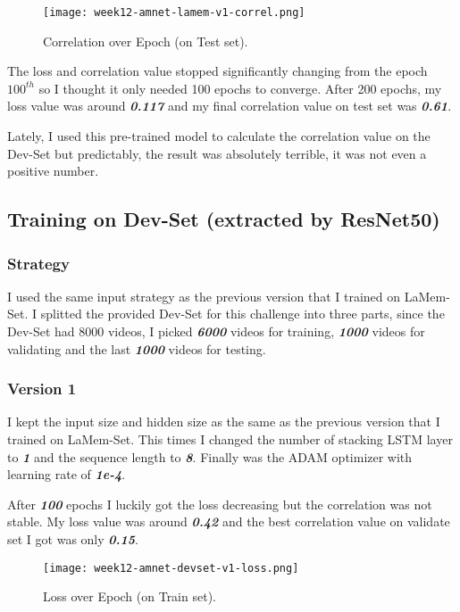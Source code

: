 \begin{figure}[!ht]
\centering
\texttt{[image: week12-amnet-lamem-v1-correl.png]}
\caption{Correlation over Epoch (on Test set).}
\end{figure}

The loss and correlation value stopped significantly changing from the epoch $100^{th}$ so I thought it only needed 100 epochs to converge. After 200 epochs, my loss value was around \textbf{\emph{0.117}} and my final correlation value on test set was \textbf{\emph{0.61}}.

Lately, I used this pre-trained model to calculate the correlation value on the Dev-Set but predictably, the result was absolutely terrible, it was not even a positive number.

\subsection{Training on Dev-Set (extracted by ResNet50)}
\subsubsection{Strategy}
I used the same input strategy as the previous version that I trained on LaMem-Set. I splitted the provided Dev-Set for this challenge into three parts, since the Dev-Set had 8000 videos, I picked \textbf{\emph{6000}} videos for training, \textbf{\emph{1000}} videos for validating and the last \textbf{\emph{1000}} videos for testing.

\subsubsection{Version 1}
I kept the input size and hidden size as the same as the previous version that I trained on LaMem-Set. This times I changed the number of stacking LSTM layer to \textbf{\emph{1}} and the sequence length to \textbf{\emph{8}}. Finally was the ADAM optimizer with learning rate of \textbf{\emph{1e-4}}.

After \textbf{\emph{100}} epochs I luckily got the loss decreasing but the correlation was not stable. My loss value was around \textbf{\emph{0.42}} and the best correlation value on validate set I got was only \textbf{\emph{0.15}}.

\begin{figure}[!ht]
\centering
\texttt{[image: week12-amnet-devset-v1-loss.png]}
\caption{Loss over Epoch (on Train set).}
\end{figure}

